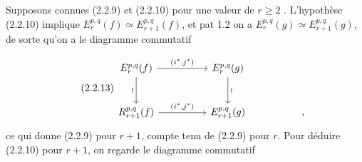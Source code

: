 
Supposons connues (2.2.9) et (2.2.10) pour une valeur de $r \geq 2$ . L'hypothèse (2.2.10) implique $E_r^{p,q}(f) \simeq E_{r+1}^{p,q}(f)$, et pat 1.2 on a $E_r^{p,q}(g) \simeq E_{r+1}^{p,q}(g)$, de sorte qu'on a le diagramme commutatif

\begin{equation}\tag{2.2.13}
\begin{tikzcd}[column sep=huge, row sep=large]
E_r^{p,q}(f) \arrow[r, "{(i^*,j^*)}"] \arrow[d, "\wr"'] & E_r^{p,q}(g) \arrow[d, "\wr"] \\
R_{r+1}^{p,q}(f) \arrow[r, "{(i^*,j^*)}"] & E_{r+1}^{p,q}(g) & ,
\end{tikzcd}
\end{equation}
ce qui donne (2.2.9) pour $r+1$, compte tenu de (2.2.9) pour $r$. Pour déduire (2.2.10) pour $r+1$, on regarde le diagramme commutatif


